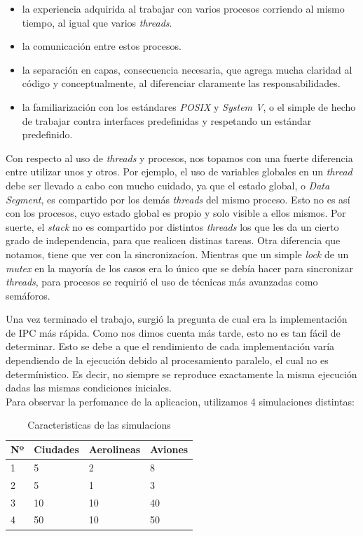 \documentclass[a4paper,10pt]{article}
\begin{document}
\begin{itemize}
\item la experiencia adquirida al trabajar con varios procesos corriendo al mismo tiempo, al igual que varios \textit{threads}.
\item la comunicación entre estos procesos.
\item la separación en capas, consecuencia necesaria, que agrega mucha claridad al código y conceptualmente, al diferenciar claramente las responsabilidades.
\item la familiarización con los estándares \textit{POSIX} y \textit{System V}, o el simple de hecho de trabajar contra interfaces predefinidas y respetando
      un estándar predefinido.
\end{itemize}

Con respecto al uso de \textit{threads}  y procesos, nos topamos con una fuerte diferencia entre utilizar unos y otros. Por ejemplo, el uso de variables globales 
en un \textit{thread} debe ser llevado a cabo con mucho cuidado, ya que el estado global, o \textit{Data Segment}, es compartido por los demás \textit{threads} del mismo
proceso. Esto no es así con los procesos, cuyo estado global es propio y solo visible a ellos mismos. Por suerte, el \textit{stack} no es compartido por distintos \textit{threads}
los que les da un cierto grado de independencia, para que realicen distinas tareas. Otra diferencia que notamos, tiene que ver con la sincronizacíon. Mientras que un
simple \textit{lock} de un \textit{mutex} en la mayoría de los casos era lo único que se debía hacer para sincronizar \textit{threads}, para procesos se requirió el uso
de técnicas más avanzadas como semáforos.

Una vez terminado el trabajo, surgió la pregunta de cual era la implementación de IPC más rápida. Como nos dimos cuenta más tarde, esto no es tan fácil de determinar. 
Esto se debe a que el rendimiento de cada implementación varía dependiendo de la ejecución debido al procesamiento paralelo, el cual no es determínistico. 
Es decir, no siempre se reproduce exactamente la misma ejecución dadas las mismas condiciones iniciales. \\

Para observar la perfomance de la aplicacion, utilizamos 4 simulaciones distintas:

\begin{table}[H]
\begin{center}
\begin{tabular}{l|l|l|l}
Nº & Ciudades & Aerolineas & Aviones \\
\hline
1 & 5 & 2 & 8 \\
2 & 5 & 1 & 3 \\
3 & 10 & 10 & 40 \\
4 & 50 & 10 & 50 \\
\end{tabular}
\caption{Caracteristicas de las simulacions}
\end{center}
\end{table}
\end{document}

